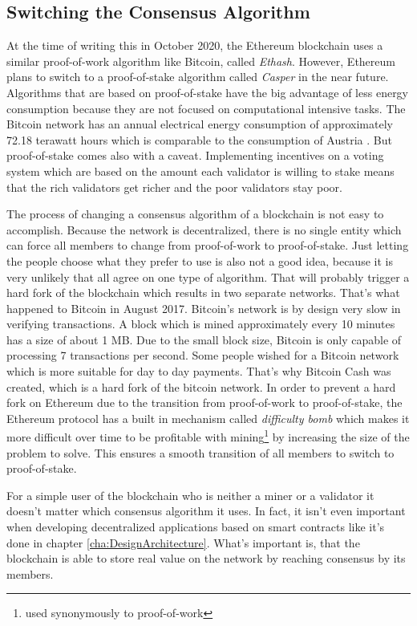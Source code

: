 \subsection{Switching the Consensus Algorithm}
At the time of writing this in October 2020, the Ethereum blockchain uses a similar proof-of-work algorithm like Bitcoin, called \textit{Ethash}. However, Ethereum plans to switch to a proof-of-stake algorithm called \textit{Casper} in the near future. Algorithms that are based on proof-of-stake have the big advantage of less energy consumption because they are not focused on computational intensive tasks. The Bitcoin network has an annual electrical energy consumption of approximately 72.18 terawatt hours which is comparable to the consumption of Austria \cite{Digiconomist2020}. But proof-of-stake comes also with a caveat. Implementing incentives on a voting system which are based on the amount each validator is willing to stake means that the rich validators get richer and the poor validators stay poor.

The process of changing a consensus algorithm of a blockchain is not easy to accomplish. Because the network is decentralized, there is no single entity which can force all members to change from proof-of-work to proof-of-stake. Just letting the people choose what they prefer to use is also not a good idea, because it is very unlikely that all agree on one type of algorithm. That will probably trigger a hard fork of the blockchain which results in two separate networks. That's what happened to Bitcoin in August 2017. Bitcoin's network is by design very slow in verifying transactions. A block which is mined approximately every 10 minutes has a size of about 1 MB. Due to the small block size, Bitcoin is only capable of processing 7 transactions per second. Some people wished for a Bitcoin network which is more suitable for day to day payments. That's why Bitcoin Cash was created, which is a hard fork of the bitcoin network. In order to prevent a hard fork on Ethereum due to the transition from proof-of-work to proof-of-stake, the Ethereum protocol \cite{Wood2020} has a built in mechanism called \textit{difficulty bomb} which makes it more difficult over time to be profitable with mining\footnote{used synonymously to proof-of-work} by increasing the size of the problem to solve. This ensures a smooth transition of all members to switch to proof-of-stake.

For a simple user of the blockchain who is neither a miner or a validator it doesn't matter which consensus algorithm it uses. In fact, it isn't even important when developing decentralized applications based on smart contracts like it's done in chapter \ref{cha:DesignArchitecture}. What's important is, that the blockchain is able to store real value on the network by reaching consensus by its members.

